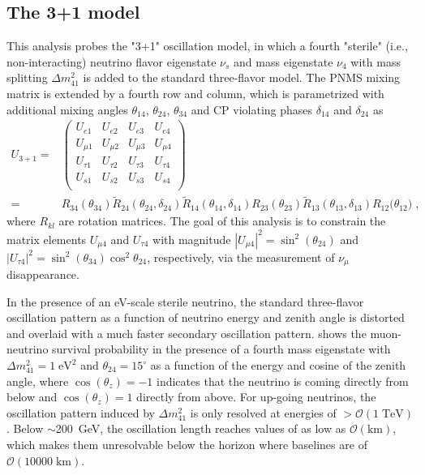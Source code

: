 \subsection{The 3+1 model}
This analysis probes the "3+1" oscillation model, in which a fourth "sterile" (i.e., non-interacting) neutrino flavor eigenstate $\nu_s$ and mass eigenstate $\nu_4$ with mass splitting $\Delta m^2_{41}$ is added to the standard three-flavor model. The PNMS mixing matrix is extended by a fourth row and column, which is parametrized with additional mixing angles $\theta_{14}$, $\theta_{24}$, $\theta_{34}$ and CP violating phases $\delta_{14}$ and $\delta_{24}$ as
\begin{align*}
    U_{3+1} =&\begin{pmatrix}
    U_{e1}    & U_{e2}    & U_{e3}   &U_{e4}    \\
    U_{\mu1}  & U_{\mu2}  & U_{\mu3} &U_{\mu4}  \\
    U_{\tau1} & U_{\tau2} & U_{\tau3}&U_{\tau4} \\
    U_{s1} & U_{s2} & U_{s3}&U_{s4} \\
    \end{pmatrix}\\
    =&
    R_{34}(\theta_{34})
    \tilde{R}_{24}(\theta_{24}, \delta_{24})
    \tilde{R}_{14}(\theta_{14}, \delta_{14})
    R_{23}(\theta_{23})
    \tilde{R}_{13}(\theta_{13}, \delta_{13})
    R_{12}({\theta_{12})}\;,
\end{align*}
where $R_{kl}$ are rotation matrices. The goal of this analysis is to constrain the matrix elements $U_{\mu4}$ and $U_{\tau4}$ with magnitude $|U_{\mu4}|^2=\sin^2(\theta_{24})$ and  $|U_{\tau4}|^2=\sin^2(\theta_{34})\cos^2\theta_{24}$, respectively, via the measurement of $\nu_\mu$ disappearance.

In the presence of an eV-scale sterile neutrino, the standard three-flavor oscillation pattern as a function of neutrino energy and zenith angle is distorted and overlaid with a much faster secondary oscillation pattern.  shows the muon-neutrino survival probability in the presence of a fourth mass eigenstate with $\Delta m^2_{41}=1\;\mathrm{eV^2}$ and $\theta_{24}=15^\circ$ as a function of the energy and cosine of the zenith angle, where $\cos(\theta_z)=-1$ indicates that the neutrino is coming directly from below and $\cos(\theta_z)=1$ directly from above. For up-going neutrinos, the oscillation pattern induced by $\Delta m^2_{41}$ is only resolved at energies of $>\mathcal{O}(1\;\mathrm{TeV})$. Below $\sim$200~GeV, the oscillation length reaches values of as low as $\mathcal{O}(\mathrm{km})$, which makes them unresolvable below the horizon where baselines are of $\mathcal{O}(10000\;\mathrm{km})$.

